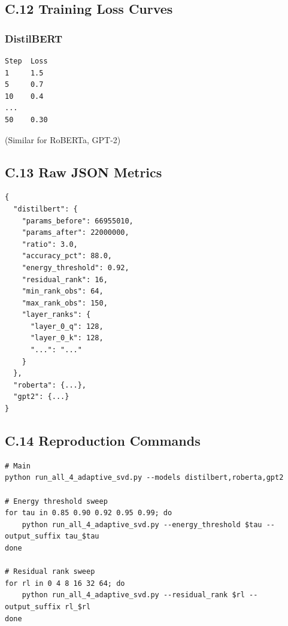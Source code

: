 \subsection{C.12 Training Loss Curves}

\subsubsection{DistilBERT}
\begin{lstlisting}
Step  Loss
1     1.5
5     0.7
10    0.4
...
50    0.30
\end{lstlisting}

(Similar for RoBERTa, GPT-2)

\subsection{C.13 Raw JSON Metrics}

\begin{lstlisting}
{
  "distilbert": {
    "params_before": 66955010,
    "params_after": 22000000,
    "ratio": 3.0,
    "accuracy_pct": 88.0,
    "energy_threshold": 0.92,
    "residual_rank": 16,
    "min_rank_obs": 64,
    "max_rank_obs": 150,
    "layer_ranks": {
      "layer_0_q": 128,
      "layer_0_k": 128,
      "...": "..."
    }
  },
  "roberta": {...},
  "gpt2": {...}
}
\end{lstlisting}

\subsection{C.14 Reproduction Commands}

\begin{lstlisting}
# Main
python run_all_4_adaptive_svd.py --models distilbert,roberta,gpt2

# Energy threshold sweep
for tau in 0.85 0.90 0.92 0.95 0.99; do
    python run_all_4_adaptive_svd.py --energy_threshold $tau --output_suffix tau_$tau
done

# Residual rank sweep
for rl in 0 4 8 16 32 64; do
    python run_all_4_adaptive_svd.py --residual_rank $rl --output_suffix rl_$rl
done
\end{lstlisting}